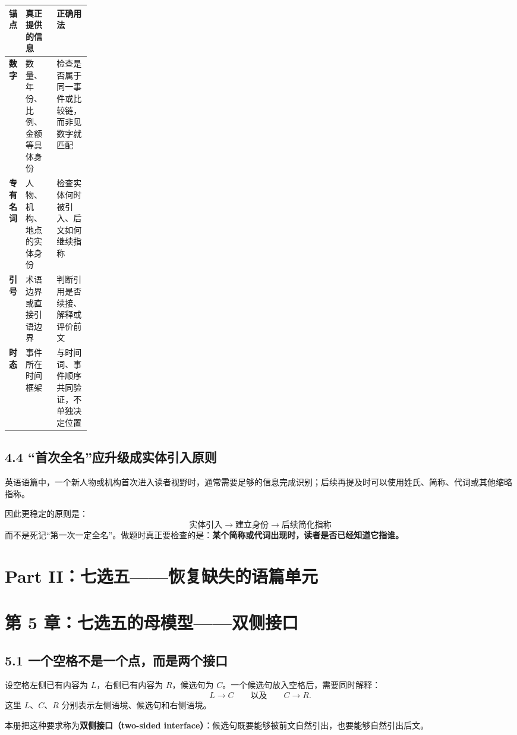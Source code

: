 \documentclass[11pt,a4paper]{ctexart}
\newcommand{\kw}[1]{\textbf{#1}}
\newcommand{\term}[2]{\textbf{#1（#2）}}
\begin{document}
\begin{center}
\small
\begin{tabularx}{\linewidth}{>{\bfseries}p{0.16\linewidth} X X}
\toprule
锚点 & 真正提供的信息 & 正确用法 \\
\midrule
数字 & 数量、年份、比例、金额等具体身份 & 检查是否属于同一事件或比较链，而非见数字就匹配 \\
专有名词 & 人物、机构、地点的实体身份 & 检查实体何时被引入、后文如何继续指称 \\
引号 & 术语边界或直接引语边界 & 判断引用是否续接、解释或评价前文 \\
时态 & 事件所在时间框架 & 与时间词、事件顺序共同验证，不单独决定位置 \\
\bottomrule
\end{tabularx}
\end{center}

\subsection{4.4 “首次全名”应升级成实体引入原则}
英语语篇中，一个新人物或机构首次进入读者视野时，通常需要足够的信息完成识别；后续再提及时可以使用姓氏、简称、代词或其他缩略指称。

因此更稳定的原则是：
\[
\boxed{
\text{实体引入}
\rightarrow
\text{建立身份}
\rightarrow
\text{后续简化指称}
}
\]
而不是死记“第一次一定全名”。做题时真正要检查的是：\kw{某个简称或代词出现时，读者是否已经知道它指谁。}

\section{Part II：七选五——恢复缺失的语篇单元}

\section{第 5 章：七选五的母模型——双侧接口}

\subsection{5.1 一个空格不是一个点，而是两个接口}
设空格左侧已有内容为 $L$，右侧已有内容为 $R$，候选句为 $C$。一个候选句放入空格后，需要同时解释：
\[
L\rightarrow C
\qquad\text{以及}\qquad
C\rightarrow R.
\]
这里 $L$、$C$、$R$ 分别表示左侧语境、候选句和右侧语境。

本册把这种要求称为\term{双侧接口}{two-sided interface}：候选句既要能够被前文自然引出，也要能够自然引出后文。
\end{document}
